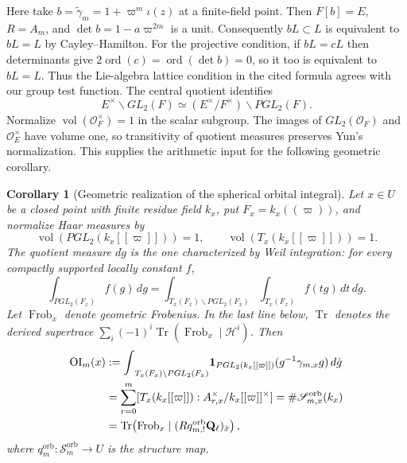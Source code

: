 \documentclass[11pt]{article}
\newtheorem{corollary}[theorem]{Corollary}
\theoremstyle{definition}
\theoremstyle{remark}
\newcommand{\Qell}{\mathbf Q_\ell}
\newcommand{\one}{\mathbf 1}
\newcommand{\ord}{\operatorname{ord}}
\newcommand{\Tr}{\operatorname{Tr}}
\newcommand{\vol}{\operatorname{vol}}
\begin{document}
Here take $b=\widetilde\gamma_m=1+\varpi^m\iota(z)$ at a finite-field
point.  Then $F[b]=E$, $R=A_m$, and $\det b=1-a\varpi^{2m}$ is a unit.
Consequently $bL\subset L$ is equivalent to $bL=L$ by Cayley--Hamilton.
For the projective condition, if $bL=cL$ then determinants give
$2\ord(c)=\ord(\det b)=0$, so it too is equivalent to $bL=L$.
Thus the Lie-algebra lattice condition in the cited formula agrees with
our group test function.
The central quotient identifies
\[
 E^\times\backslash GL_2(F)
 \simeq (E^\times/F^\times)\backslash PGL_2(F).
\]
Normalize $\vol(\mathcal O_F^\times)=1$ in the scalar subgroup.
The images of $GL_2(\mathcal O_F)$ and $\mathcal O_E^\times$ have volume
one, so transitivity of quotient measures preserves Yun's normalization.
This supplies the arithmetic input for the following geometric corollary.

\begin{corollary}[Geometric realization of the spherical orbital integral]
\label{cor:PGL2-orbital-integral-realization}
Let $x\in U$ be a closed point with finite residue field $k_x$, put
$F_x=k_x((\varpi))$, and normalize Haar measures by
\[
 \operatorname{vol}(PGL_2(k_x[[\varpi]]))=1,
 \qquad \operatorname{vol}(T_x(k_x[[\varpi]]))=1.
\]
The quotient measure $d\dot g$ is the one characterized by Weil integration:
for every compactly supported locally constant $f$,
\begin{equation}
 \int_{PGL_2(F_x)}f(g)\,dg
 =\int_{T_x(F_x)\backslash PGL_2(F_x)}
   \int_{T_x(F_x)}f(tg)\,dt\,d\dot g.
 \label{eq:PGL2-Weil-quotient-measure}
\end{equation}
Let $\operatorname{Frob}_x$ denote geometric Frobenius.  In the last line
below, $\Tr$ denotes the derived supertrace
$\sum_i(-1)^i\operatorname{Tr}(\operatorname{Frob}_x\mid\mathcal H^i)$.
Then
\begin{align}
 \operatorname{OI}_m(x)
 &:={\int}_{T_x(F_x)\backslash PGL_2(F_x)}
 \one_{PGL_2(k_x[[\varpi]])}(g^{-1}\gamma_{m,x}g)\,d\dot g
 \notag\\
 &=\sum_{r=0}^m
   [T_x(k_x[[\varpi]]):A_{r,x}^\times/k_x[[\varpi]]^\times]
 =\#\mathscr S_{m,x}^{\mathrm{orb}}(k_x)
 \notag\\
 &=\Tr\!\left(\operatorname{Frob}_x\mid
   (Rq^{\mathrm{orb}}_{m,!}\Qell)_{\bar x}\right),
 \label{eq:PGL2-orbital-trace}
\end{align}
where $q_m^{\mathrm{orb}}:\mathscr S_m^{\mathrm{orb}}\to U$ is the structure
map.
\end{corollary}
\end{document}
